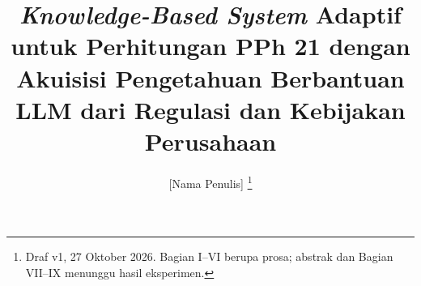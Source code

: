\documentclass[journal,a4paper]{IEEEtran}
\newcommand{\en}[1]{\textit{#1}}
\begin{document}
\title{\en{Knowledge-Based System} Adaptif untuk Perhitungan PPh 21 dengan Akuisisi Pengetahuan Berbantuan LLM dari Regulasi dan Kebijakan Perusahaan}
\author{[Nama Penulis]%
\thanks{Draf v1, 27 Oktober 2026. Bagian I--VI berupa prosa; abstrak dan Bagian VII--IX menunggu hasil eksperimen.}}
\maketitle














\end{document}
